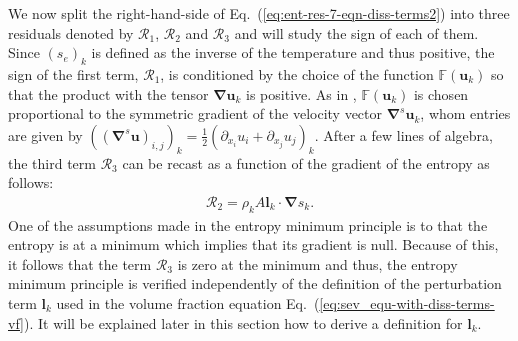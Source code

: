 \documentclass[preprint,10pt]{elsarticle}
\newcommand{\grad}{\mbold{\nabla}}
\newcommand{\mbold}[1]{\boldsymbol#1}
\newcommand{\eqt}[1]{Eq.~(\ref{#1})}                     %
\begin{document}
%
We now split the right-hand-side of \eqt{eq:ent-res-7-eqn-diss-terms2} into three residuals denoted by $\mathcal{R}_1$, $\mathcal{R}_2$ and $\mathcal{R}_3$ and will study the sign of each of them. Since $(s_e)_k$ is defined as the inverse of the temperature and thus positive, the sign of the first term, $\mathcal{R}_1$, is conditioned by the choice of the function $\mathbb{F}(\mbold u_k)$ so that the product with the tensor $\grad \mbold u_k$ is positive. As in \cite{jlg, Marco_paper_low_mach}, $\mathbb{F}(\mbold u_k)$ is chosen proportional to the symmetric gradient of the velocity vector $\grad^s \mbold u_k$, whom entries are given by $\left( (\grad^s \mbold u)_{i,j} \right)_k = \frac{1}{2} \left( \partial_{x_i} u_i + \partial_{x_j} u_j \right)_k$. 
%
After a few lines of algebra, the third term ${\mathcal{R}_3}$ can be recast as a function of the gradient of the entropy as follows:
\begin{align}
 \label{eq:ent-R3-sct4}
  \mathcal{R}_2  =  \rho_k A \mbold l_k \cdot \grad s_k.
\end{align} 
One of the assumptions made in the entropy minimum principle is to that the entropy 
is at a minimum which implies that its gradient is null. Because of this, it follows that
the term $\mathcal{R}_3$ is zero at the minimum and thus, the entropy minimum principle is verified
independently of the definition of the perturbation term $\mbold l_k$ used in the volume fraction
equation \eqt{eq:sev_equ-with-diss-terms-vf}. It will be explained later in this section how to derive a definition for $\mbold l_k$.
\end{document}

